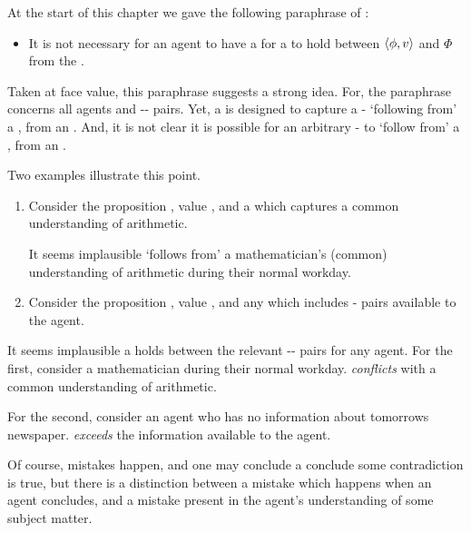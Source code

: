 \begin{note}
  At the start of this chapter we gave the following paraphrase of \supportII{}:
  \begin{itemize}
  \item
    It is not necessary for an agent to have a \wit{} for a \ros{} to hold between \(\langle \phi, v \rangle\) and \(\Phi\) from the \agpe{\agents{}}.
  \end{itemize}
  Taken at face value, this paraphrase suggests a strong idea.
  For, the paraphrase concerns all agents and -- pairs.
  Yet, a \ros{} is designed to capture a - `following from' a \pool{}, from an \agpe{}.
  And, it is not clear it is possible for an arbitrary - to `follow from' a \pool{}, from an \agpe{}.

  Two examples illustrate this point.

  \begin{enumerate}
  \item
    Consider the proposition , value , and a \pool{} which captures a common understanding of arithmetic.

    It seems implausible  `follows from' a mathematician's (common) understanding of arithmetic during their normal workday.
  \item
    Consider the proposition , value , and any \pool{} which includes - pairs available to the agent.
  \end{enumerate}

  It seems implausible a \ros{} holds between the relevant -- pairs for any agent.
  For the first, consider a mathematician during their normal workday.
   \emph{conflicts} with a common understanding of arithmetic.

  For the second, consider an agent who has no information about tomorrows newspaper.
   \emph{exceeds} the information available to the agent.


  Of course, mistakes happen, and one may conclude a conclude some contradiction is true, but there is a distinction between a mistake which happens when an agent concludes, and a mistake present in the agent's understanding of some subject matter.
\end{note}

